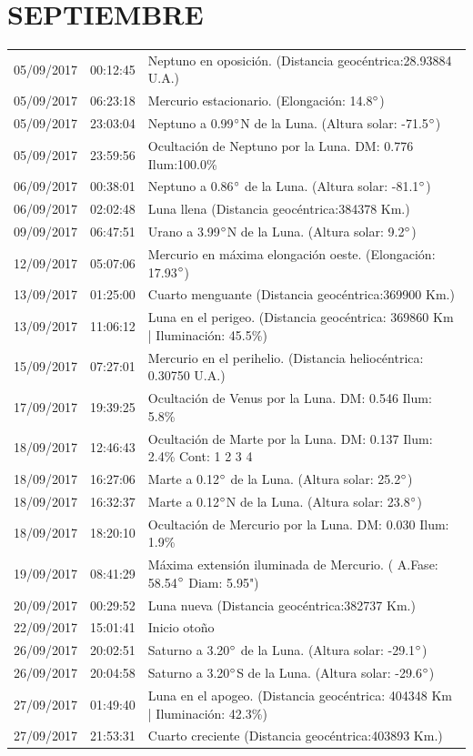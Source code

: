 \documentclass[12pt,a4paper,oneside]{article}
\begin{document}
\section{SEPTIEMBRE}
\begin{center}
\begin{tabular}{ |l| l| l| }
\hline
05/09/2017& 00:12:45 &	Neptuno en oposición. (Distancia geocéntrica:28.93884 U.A.)	\\
05/09/2017& 06:23:18 &	Mercurio estacionario. (Elongación: 14.8$\degree $)	\\
05/09/2017& 23:03:04 &	Neptuno a 0.99$\degree $N de la Luna. (Altura solar: -71.5$\degree $)	\\
05/09/2017& 23:59:56 &	Ocultación de Neptuno por la Luna. DM: 0.776 Ilum:100.0\% 	\\
06/09/2017& 00:38:01 &	Neptuno a 0.86$\degree $ de la Luna. (Altura solar: -81.1$\degree $)	\\
06/09/2017& 02:02:48 &	Luna llena (Distancia geocéntrica:384378 Km.)	\\
09/09/2017& 06:47:51 &	Urano a 3.99$\degree $N de la Luna. (Altura solar: 9.2$\degree $)	\\
12/09/2017& 05:07:06 &	Mercurio en máxima elongación oeste. (Elongación: 17.93$\degree $)	\\
13/09/2017& 01:25:00 &	Cuarto menguante (Distancia geocéntrica:369900 Km.)	\\
13/09/2017& 11:06:12 &	Luna en el perigeo. (Distancia geocéntrica: 369860 Km | Iluminación: 45.5\%)	\\
15/09/2017& 07:27:01 &	Mercurio en el perihelio. (Distancia heliocéntrica: 0.30750 U.A.)	\\
17/09/2017& 19:39:25 &	Ocultación de Venus por la Luna. DM: 0.546 Ilum: 5.8\% 	\\
18/09/2017& 12:46:43 &	Ocultación de Marte por la Luna. DM: 0.137 Ilum: 2.4\% Cont: 1 2 3 4	\\
18/09/2017& 16:27:06 &	Marte a 0.12$\degree $ de la Luna. (Altura solar: 25.2$\degree $)	\\
18/09/2017& 16:32:37 &	Marte a 0.12$\degree $N de la Luna. (Altura solar: 23.8$\degree $)	\\
18/09/2017& 18:20:10 &	Ocultación de Mercurio por la Luna. DM: 0.030 Ilum: 1.9\% \\
19/09/2017& 08:41:29 &	Máxima extensión iluminada de Mercurio. ( A.Fase: 58.54$\degree $ Diam: 5.95")	\\
20/09/2017& 00:29:52 &	Luna nueva (Distancia geocéntrica:382737 Km.)	\\
22/09/2017& 15:01:41 &	Inicio otoño	\\
26/09/2017& 20:02:51 &	Saturno a 3.20$\degree $ de la Luna. (Altura solar: -29.1$\degree $)	\\
26/09/2017& 20:04:58 &	Saturno a 3.20$\degree $S de la Luna. (Altura solar: -29.6$\degree $)	\\
27/09/2017& 01:49:40 &	Luna en el apogeo. (Distancia geocéntrica: 404348 Km | Iluminación: 42.3\%)	\\
27/09/2017& 21:53:31 &	Cuarto creciente (Distancia geocéntrica:403893 Km.)	\\
\hline
\end{tabular}
\end{center}
\end{document}
